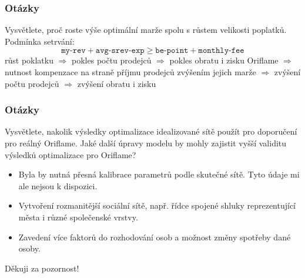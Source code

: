 \documentclass[xcolor=dvipsnames]{beamer}
\begin{document}
  \begin{frame}
    \frametitle{Otázky}
    Vysvětlete, proč roste výše optimální marže spolu s růstem velikosti poplatků.\\[1cm]
    Podmínka setrvání:
    \[ \texttt{my-rev} + \texttt{avg-srev-exp} \geq \texttt{be-point} + \texttt{monthly-fee} \]
    růst poklatku $\Rightarrow$ pokles počtu prodejců $\Rightarrow$ pokles obratu i zisku Oriflame $\Rightarrow$ nutnost kompenzace na straně příjmu prodejců zvýšením jejich marže $\Rightarrow$ zvýšení počtu prodejců $\Rightarrow$ zvýšení obratu i zisku
  \end{frame}
  \begin{frame}
    \frametitle{Otázky}
    Vysvětlete, nakolik výsledky optimalizace idealizované sítě použít pro doporučení pro reálný Oriflame. Jaké další úpravy modelu by mohly zajistit vyšší validitu výsledků optimalizace pro Oriflame?\\[1cm]
    \begin{itemize}
    \item Byla by nutná přesná kalibrace parametrů podle skutečné sítě. Tyto údaje mi ale nejsou k dispozici.
    \item Vytvoření rozmanitější sociální sítě, např. řídce spojené shluky reprezentující města i různé společenské vrstvy.
    \item Zavedení více faktorů do rozhodování osob a možnost změny spotřeby dané osoby.
    \end{itemize}
  \end{frame}
  \begin{frame}
    \begin{center}Děkuji za pozornost!\end{center}
  \end{frame}
      
\end{document}
